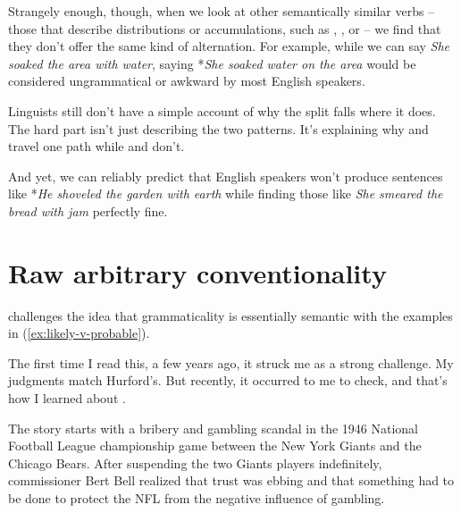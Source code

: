 Strangely enough, though, when we look at other semantically similar verbs -- those that describe distributions or accumulations, such as , , or  -- we find that they don't offer the same kind of alternation. For example, while we can say \textit{She soaked the area with water}, saying *\textit{She soaked water on the area} would be considered ungrammatical or awkward by most English speakers.

Linguists still don't have a simple account of why the split falls where it does. The hard part isn't just describing the two patterns. It's explaining why  and  travel one path while  and  don't.

And yet, we can reliably predict that English speakers won't produce sentences like *\textit{He shoveled the garden with earth} while finding those like \textit{She smeared the bread with jam} perfectly fine.

\section{Raw arbitrary conventionality}

\citet[231]{Hurford2012a} challenges the idea that grammaticality is essentially semantic with the examples in (\ref{ex:likely-v-probable}).

\ea \label{ex:likely-v-probable}
    \z
\z

The first time I read this, a few years ago, it struck me as a strong challenge. My judgments match Hurford's. But recently, it occurred to me to check, and that's how I learned about .

\bigskip

The story starts with a bribery and gambling scandal in the 1946 National Football League championship game between the New York Giants and the Chicago Bears. After suspending the two Giants players indefinitely, commissioner Bert Bell realized that trust was ebbing and that something had to be done to protect the NFL from the negative influence of gambling.

